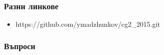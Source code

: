 \documentclass[serif,mathserif]{beamer}
\begin{document}
\begin{frame}
  \frametitle{Разни линкове}
  \begin{itemize}
  \item https://github.com/ymadzhunkov/cg2\_2015.git
  \end{itemize}
\end{frame}

\begin{frame}
  \frametitle{Въпроси}
\end{frame}
\end{document}
